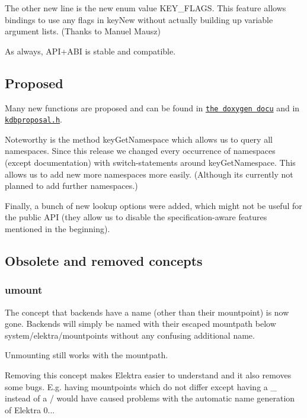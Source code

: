 The other new line is the new enum value {\ttfamily K\+E\+Y\+\_\+\+F\+L\+A\+G\+S}. This feature allows bindings to use any flags in key\+New without actually building up variable argument lists. (Thanks to Manuel Mausz)

As always, A\+P\+I+\+A\+B\+I is stable and compatible.

\subsection*{Proposed}

Many new functions are proposed and can be found in \href{http://doc.libelektra.org/api/0.8.11/html}{\tt the doxygen docu} and in \href{https://github.com/ElektraInitiative/libelektra/blob/master/src/include/kdbproposal.h}{\tt kdbproposal.\+h}.

Noteworthy is the method {\ttfamily key\+Get\+Namespace} which allows us to query all namespaces. Since this release we changed every occurrence of namespaces (except documentation) with switch-\/statements around {\ttfamily key\+Get\+Namespace}. This allows us to add new more namespaces more easily. (Although its currently not planned to add further namespaces.)

Finally, a bunch of new lookup options were added, which might not be useful for the public A\+P\+I (they allow us to disable the specification-\/aware features mentioned in the beginning).

\subsection*{Obsolete and removed concepts}

\subsubsection*{umount}

The concept that backends have a name (other than their mountpoint) is now gone. Backends will simply be named with their escaped mountpath below system/elektra/mountpoints without any confusing additional name.

Unmounting still works with the mountpath.

Removing this concept makes Elektra easier to understand and it also removes some bugs. E.\+g. having mountpoints which do not differ except having a {\ttfamily \+\_\+} instead of a {\ttfamily /} would have caused problems with the automatic name generation of Elektra 0...

